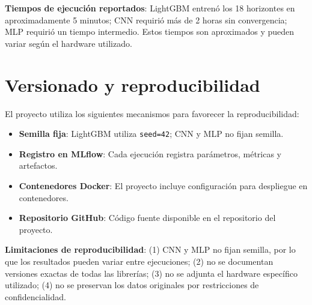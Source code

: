 \textbf{Tiempos de ejecución reportados}: LightGBM entrenó los 18 horizontes en aproximadamente 5 minutos; CNN requirió más de 2 horas sin convergencia; MLP requirió un tiempo intermedio. Estos tiempos son aproximados y pueden variar según el hardware utilizado.

\section{Versionado y reproducibilidad}

El proyecto utiliza los siguientes mecanismos para favorecer la reproducibilidad:

\begin{itemize}
    \item \textbf{Semilla fija}: LightGBM utiliza \texttt{seed=42}; CNN y MLP no fijan semilla.
    \item \textbf{Registro en MLflow}: Cada ejecución registra parámetros, métricas y artefactos.
    \item \textbf{Contenedores Docker}: El proyecto incluye configuración para despliegue en contenedores.
    \item \textbf{Repositorio GitHub}: Código fuente disponible en el repositorio del proyecto.
\end{itemize}

\textbf{Limitaciones de reproducibilidad}: (1) CNN y MLP no fijan semilla, por lo que los resultados pueden variar entre ejecuciones; (2) no se documentan versiones exactas de todas las librerías; (3) no se adjunta el hardware específico utilizado; (4) no se preservan los datos originales por restricciones de confidencialidad.